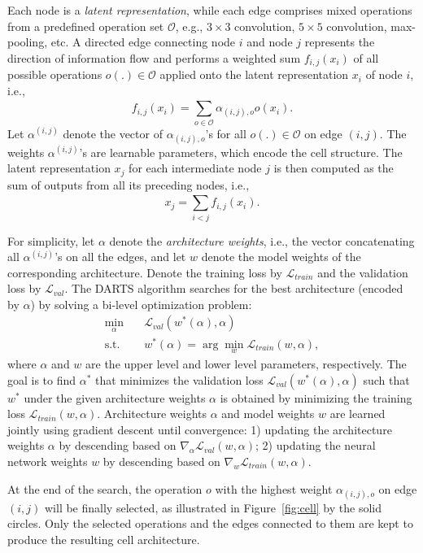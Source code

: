 \documentclass[a4paper]{article}
\begin{document}
Each node is a \textit{latent representation}, while each edge comprises mixed operations from a predefined operation set $\mathcal{O}$, e.g., $3\times3$ convolution, $5\times5$ convolution, max-pooling, etc. 
A directed edge connecting node $i$ and node $j$ represents the direction of information flow and performs a weighted sum $f_{i,j}(x_i)$ of all possible operations $o(.)\in \mathcal{O}$ applied onto the latent representation $x_i$ of node $i$,  i.e., 
\[
f_{i,j}(x_i) = \sum_{o \in \mathcal{O}}^{} \alpha_{(i,j), o} o(x_i).
\]
Let $\alpha^{(i,j)}$ denote the vector of $\alpha_{(i,j), o}$'s for all $o(.)\in \mathcal{O}$ on edge $(i,j)$.
The weights $\alpha^{(i,j)}$'s are learnable parameters, which encode the cell structure.
The latent representation $x_j$ for each intermediate node $j$ is then computed as the sum of outputs from all its preceding nodes, i.e., \[
x_j = \sum_{i < j}^{} f_{i, j}(x_i).
\]

For simplicity, let $\alpha$ denote the \textit{architecture weights}, i.e., the vector concatenating all $\alpha^{(i,j)}$'s on all the edges, and let $w$ denote the model weights of the corresponding architecture. 
Denote the training loss by $\mathcal{L}_{train}$ and the validation loss by $ \mathcal{L}_{val}$.
The DARTS algorithm searches for the best architecture (encoded by $\alpha$) by solving a bi-level optimization problem: 
\begin{equation}
\label{eqn:alphaop}
\begin{aligned}
\min_{\alpha}&\quad \mathcal{L}_{val}(w^*(\alpha), \alpha) \\
\mbox{s.t.} &\quad w^*(\alpha) = \arg\min_w \mathcal{L}_{train}(w,\alpha),
\end{aligned}
\end{equation}
where $\alpha$ and $w$ are the upper level and lower level parameters, respectively.
The goal is to find $\alpha^*$ that minimizes the validation loss $\mathcal{L}_{val}(w^*(\alpha), \alpha)$ such that $w^*$ under the given architecture weights $\alpha$ is obtained by minimizing the training loss $\mathcal{L}_{train}(w,\alpha)$. Architecture weights $\alpha$ and model weights $w$ are learned jointly using gradient descent \cite{liu2018darts} until convergence: 1) updating the architecture weights $\alpha$ by descending based on $\nabla_\alpha \mathcal{L}_{val}(w , \alpha)$; 2) updating the neural network weights $w$ by descending  based on $\nabla_w\mathcal{L}_{train}(w,\alpha)$.
      
At the end of the search, the operation $o$ with the highest weight $\alpha_{(i,j), o}$ on edge $(i,j)$ will be finally selected, as illustrated in Figure~\ref{fig:cell} by the solid circles. Only the selected operations and the edges connected to them are kept to produce the resulting cell architecture. 
\end{document}
